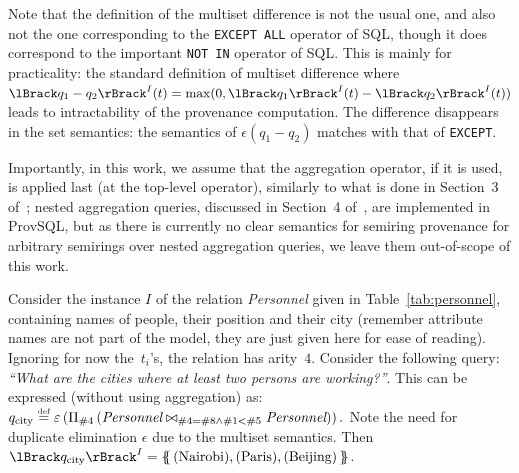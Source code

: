 Note that the definition of the multiset difference is not the usual one,
and also not the one corresponding to the \texttt{EXCEPT ALL} operator of
SQL, though it does correspond to the important \texttt{NOT IN}
operator of SQL. This is mainly for practicality: the standard definition of multiset
difference
where $\sem{I}{q_1-q_2}(t)=\max(0,\sem{I}{q_1}(t)-\sem{I}{q_2}(t))$ leads
to intractability of the provenance computation. The difference
disappears in the set semantics: the semantics of $\epsilon(q_1-q_2)$
matches with that of \texttt{EXCEPT}.

Importantly, in this work, we assume that the aggregation operator, if it is used, is
applied last (at the top-level operator), similarly to what is done in
Section~3 of~\cite{amsterdamer2011provenance}; nested aggregation
queries, discussed in Section~4 of~\cite{amsterdamer2011provenance}, are
implemented in ProvSQL, but as there is currently no clear semantics for
semiring provenance for arbitrary semirings over nested aggregation
queries, we leave them out-of-scope of this work.

\begin{example}\label{ex:semantics}
	Consider the instance $I$ of the
	relation \textit{Personnel} given in Table~\ref{tab:personnel},
	containing names of people, their position and their city (remember attribute
	names are not part of the model, they are just given here for ease of
	reading). Ignoring for now the~$t_i$'s, the
	relation has arity~$4$.
	Consider the following query: \emph{``What are the cities where at
		least two persons are working?''}. This
	can be expressed (without using aggregation) as:
	\(
		q_{\mathrm{city}}\overset{\text{\tiny def}}{=}\varepsilon\left(\Pi_{\#4}\left(\textit{Personnel}\bowtie_{\#4=\#8\land\#1<\#5}
			\textit{Personnel}\right)\right).
	\)
	Note the need for duplicate elimination $\epsilon$ due to the
	multiset semantics. Then
  $\sem{I}{\qex}=\mset{(\textup{\revision{Nairobi}}),(\textup{Paris}),(\textup{\revision{Beijing}})}$.
\end{example}

